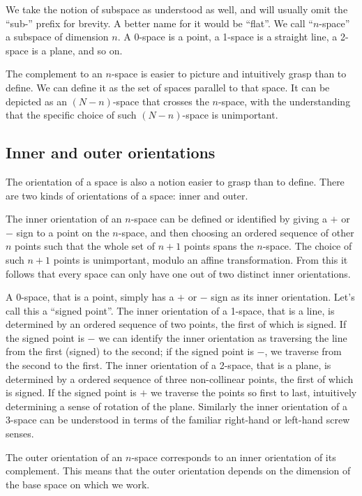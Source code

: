 \documentclass[\ifafour a4paper,12pt,\else a5paper,10pt,\fi%
onecolumn,oneside,article,%
british%
]{memoir}
\theoremstyle{remark}
\theoremstyle{innote}
\renewcommand*{\|}[1][]{\nonscript\:#1\vert\nonscript\:\mathopen{}}
\begin{document}
We take the notion of subspace as understood as well, and will usually omit
the \enquote{sub-} prefix for brevity. A better name for it would be
\enquote{flat}. We call \enquote{$n$-space} a subspace of dimension $n$. A
0-space is a point, a 1-space is a straight line, a 2-space is a plane, and
so on.

The complement to an $n$-space is easier to picture and intuitively grasp
than to define. We can define it as the set of spaces parallel to that
space. It can be depicted as an $(N-n)$-space that crosses the $n$-space,
with the understanding that the specific choice of such $(N-n)$-space is
unimportant.


\subsection{Inner and outer orientations}
\label{sec:orientation}

The orientation of a space is also a notion easier to grasp than to define.
There are two kinds of orientations of a space: inner and outer.

The inner orientation of an $n$-space can be defined or identified by
giving a $+$ or $-$ sign to a point on the $n$-space, and then choosing an
ordered sequence of other $n$ points such that the whole set of $n+1$
points spans the $n$-space. The choice of such $n+1$ points is unimportant,
modulo an affine transformation. From this it follows that every space can
only have one out of two distinct inner orientations.

A 0-space, that is a point, simply has a $+$ or $-$ sign as its inner
orientation. Let's call this a \enquote{signed point}. The inner
orientation of a 1-space, that is a line, is determined by an ordered
sequence of two points, the first of which is signed. If the signed point
is $-$ we can identify the inner orientation as traversing the line from
the first (signed) to the second; if the signed point is $-$, we traverse
from the second to the first. The inner orientation of a 2-space, that is a
plane, is determined by a ordered sequence of three non-collinear points,
the first of which is signed. If the signed point is $+$ we traverse the
points so first to last, intuitively determining a sense of rotation of the
plane. Similarly the inner orientation of a 3-space can be understood in
terms of the familiar right-hand or left-hand screw senses.

The outer orientation of an $n$-space corresponds to an inner orientation
of its complement. This means that the outer orientation depends on the
dimension of the base space on which we work.
\end{document}
